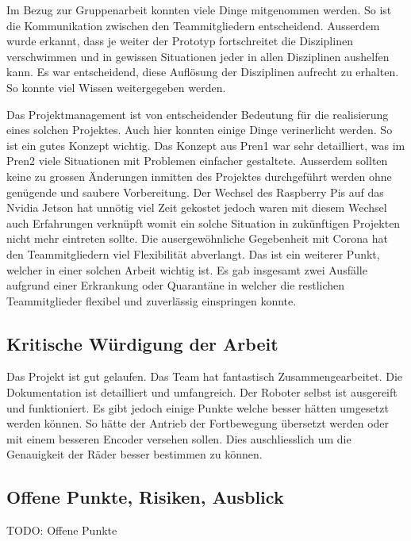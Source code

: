 Im Bezug zur Gruppenarbeit konnten viele Dinge mitgenommen werden. So ist die Kommunikation zwischen den Teammitgliedern entscheidend. Ausserdem wurde erkannt, dass je weiter der Prototyp fortschreitet die Disziplinen verschwimmen und in gewissen Situationen jeder in allen Disziplinen aushelfen kann. Es war entscheidend, diese Auflösung der Disziplinen aufrecht zu erhalten. So konnte viel Wissen weitergegeben werden.

Das Projektmanagement ist von entscheidender Bedeutung für die realisierung eines solchen Projektes. Auch hier konnten einige Dinge verinerlicht werden. So ist ein gutes Konzept wichtig. Das Konzept aus Pren1 war sehr detailliert, was im Pren2 viele Situationen mit Problemen einfacher gestaltete. Ausserdem sollten keine zu grossen Änderungen inmitten des Projektes durchgeführt werden ohne genügende und saubere Vorbereitung. Der Wechsel des Raspberry Pis auf das Nvidia Jetson hat unnötig viel Zeit gekostet jedoch waren mit diesem Wechsel auch Erfahrungen verknüpft womit ein solche Situation in zukünftigen Projekten nicht mehr eintreten sollte. Die ausergewöhnliche Gegebenheit mit Corona hat den Teammitgliedern viel Flexibilität abverlangt. Das ist ein weiterer Punkt, welcher in einer solchen Arbeit wichtig ist. Es gab insgesamt zwei Ausfälle aufgrund einer Erkrankung oder Quarantäne in welcher die restlichen Teammitglieder flexibel und zuverlässig einspringen konnte.



\subsection{Kritische Würdigung der Arbeit}

Das Projekt ist gut gelaufen. Das Team hat fantastisch Zusammengearbeitet. Die Dokumentation ist detailliert und umfangreich. Der Roboter selbst ist ausgereift und funktioniert. Es gibt jedoch einige Punkte welche besser hätten umgesetzt werden können. So hätte der Antrieb der Fortbewegung übersetzt werden oder mit einem besseren Encoder versehen sollen. Dies auschliesslich um die Genauigkeit der Räder besser bestimmen zu können.


\subsection{Offene Punkte, Risiken, Ausblick}

TODO: Offene Punkte

\newpage

